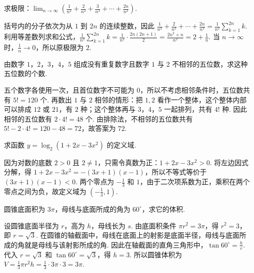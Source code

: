 \documentclass[UTF8,a4paper,oneside,11pt]{ctexbook}
\begin{document}
\begin{problem}
求极限：\(\displaystyle\lim_{n\to\infty}\left(\frac{1}{n^2} + \frac{2}{n^2} + \frac{3}{n^2} + \cdots + \frac{2n}{n^2}\right)\).
\end{problem}

\begin{solution}
括号内的分子依次为从 \(1\) 到 \(2n\) 的连续整数，因此 \(\frac{1}{n^2}+\frac{2}{n^2}+\cdots+\frac{2n}{n^2}=\frac1{n^2}\sum_{k=1}^{2n}k\). 利用等差数列求和公式，\(\frac1{n^2}\sum_{k=1}^{2n}k=\frac1{n^2}\cdot\frac{2n(2n+1)}2=\frac{2n^2+n}{n^2}=2+\frac1n\). 当 \(n\to\infty\) 时，\(\frac1n\to0\)，所以原极限为 \(2\).
\end{solution}

\begin{problem}
由数字 \(1\)，\(2\)，\(3\)，\(4\)，\(5\) 组成没有重复数字且数字 \(1\) 与 \(2\) 不相邻的五位数，求这种五位数的个数.
\end{problem}

\begin{solution}
五个数字各使用一次，且首位数字不可能为 \(0\)，所以不考虑相邻条件时，五位数共有 \(5!=120\) 个. 再数出 \(1\) 与 \(2\) 相邻的情形：把 \(1,2\) 看作一个整体，这个整体内部可以排成 \(12\) 或 \(21\)，有 \(2\) 种；这个整体再与 \(3\)，\(4\)，\(5\) 一起排列，共有 \(4!\) 种. 因此相邻的五位数有 \(2\cdot4!=48\) 个. 由排除法，不相邻的五位数共有 \(5!-2\cdot4!=120-48=72\)，故答案为 \(72\).
\end{solution}

\begin{problem}
求函数 \(y = \log_2(1 + 2x - 3x^2)\) 的定义域.
\end{problem}

\begin{solution}
因为对数的底数 \(2>0\) 且 \(2\ne1\)，只需令真数为正：\(1+2x-3x^2>0\). 将左边因式分解，得 \(1+2x-3x^2=-(3x+1)(x-1)\)，所以不等式等价于 \((3x+1)(x-1)<0\). 两个零点为 \(-\frac13\) 和 \(1\)，由于二次项系数为正，乘积在两个零点之间为负，故定义域为 \(\left(-\frac13,1\right)\).
\end{solution}

\begin{problem}
圆锥底面积为 \(3\pi\)，母线与底面所成的角为 \(60^\circ\)，求它的体积.
\end{problem}

\begin{solution}
设圆锥底面半径为 \(r\)，高为 \(h\)，母线长为 \(s\). 由底面积条件 \(\pi r^2=3\pi\)，得 \(r^2=3\)，即 \(r=\sqrt3\). 在圆锥的轴截面中，母线在底面上的射影是底面半径，母线与底面所成的角就是母线与该射影所成的角. 因此在轴截面的直角三角形中，\(\tan60^\circ=\frac hr\). 代入 \(r=\sqrt3\) 和 \(\tan60^\circ=\sqrt3\)，得 \(h=3\). 所以圆锥体积为 \(V=\frac13\pi r^2h=\frac13\cdot3\pi\cdot3=3\pi\).
\end{solution}
\end{document}
